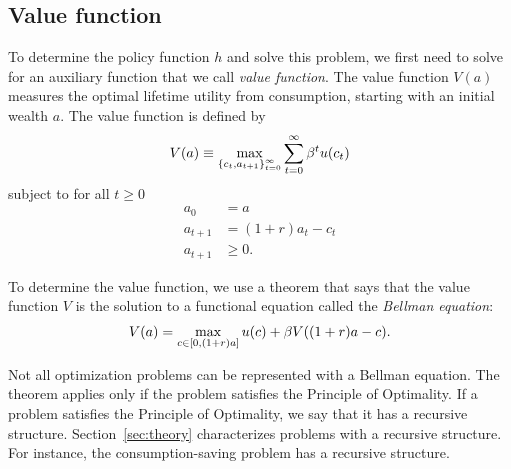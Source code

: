\documentclass[letterpaper, 11pt, leqno]{article}
\begin{document}
\subsection{Value function}

To determine the policy function $h$ and solve this problem, we first need to solve for an auxiliary function that we call \textit{value function}. The value function $V(a)$ measures the optimal lifetime utility from consumption, starting with an initial wealth $a$. The value function is defined by
\begin{equation}
V(a)\equiv \max[\bc{c_t,a_{t+1}}_{t=0}^{\infty}] \sum_{t=0}^{\infty}\b^t u(c_t)\label{e:value}
\end{equation}
subject to for all $t\ge 0$
\begin{align*}
a_{0}&= a\\
a_{t+1}&=(1+r) a_t-c_t\\
a_{t+1}&\ge 0.
\end{align*}

To determine the value function, we use a theorem that says that the value function $V$ is the solution to a functional equation called the \textit{Bellman equation}:
\begin{align}
 V(a)=\max[c\in[0,(1+r) a]] u(c)+\b V((1+r) a-c).\label{e:recur}
\end{align}

Not all optimization problems can be represented with a Bellman equation. The theorem applies only if the problem satisfies the Principle of Optimality. If a problem satisfies the Principle of Optimality, we say that it has a recursive structure. Section~\ref{sec:theory} characterizes problems with a recursive structure. For instance, the consumption-saving problem has a recursive structure.
\end{document}
